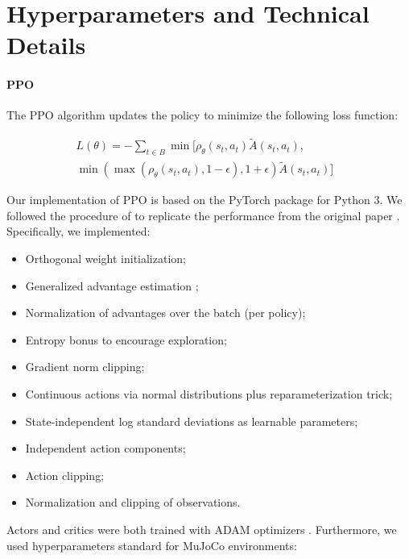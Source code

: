 \section{Hyperparameters and Technical Details}

\paragraph{PPO}

The PPO algorithm updates the policy to minimize the following loss function:

\begin{equation}\label{eq:loss_ppo_actor}
    \begin{split}
    L(\theta) = - \sum_{t \in B} \min[\rho_\theta(s_t, a_t) \tilde{A}(s_t, a_t),& \\  \min(\max(\rho_\theta(s_t, a_t), 1-\epsilon), 1+\epsilon) \tilde{A}(s_t, a_t)]&
    \end{split} %
\end{equation}

Our implementation of PPO is based on the PyTorch package \cite{paszke2019pytorch} for Python 3. We followed the procedure of \cite{shengyi2022the37implementation} to replicate the performance from the original paper \cite{schulman2017proximal}. Specifically, we implemented:

\begin{itemize}
    \item Orthogonal weight initialization;
    \item Generalized advantage estimation \cite{schulman2015high};
    \item Normalization of advantages over the batch (per policy);
    \item Entropy bonus to encourage exploration;
    \item Gradient norm clipping;
    \item Continuous actions via normal distributions plus reparameterization trick;
    \item State-independent log standard deviations as learnable parameters;
    \item Independent action components;
    \item Action clipping;
    \item Normalization and clipping of observations.
\end{itemize}

Actors and critics were both trained with ADAM optimizers \cite{kingma2014adam}. Furthermore, we used hyperparameters standard for MuJoCo environments:

